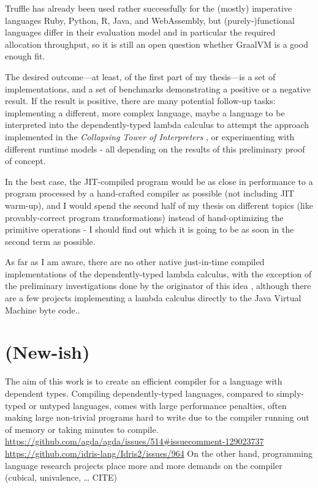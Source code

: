 \documentclass[english,zadani,odsaz]{fitthesis}
\begin{document}
Truffle has already been used rather successfully for the (mostly) imperative
languages Ruby, Python, R, Java, and WebAssembly, but (purely-)functional
languages differ in their evaluation model and in particular the required
allocation throughput, so it is still an open question whether GraalVM is a good
enough fit.

The desired outcome---at least, of the first part of my thesis---is a set of
implementations, and a set of benchmarks demonstrating a positive or a negative
result.  If the result is positive, there are many potential follow-up tasks:
implementing a different, more complex language, maybe a language to be
interpreted into the dependently-typed lambda calculus to attempt the approach
implemented in the \emph{Collapsing Tower of Interpreters} \cite{amin18_collapsing_towers},
or experimenting with different runtime models - all depending on the results of
this preliminary proof of concept.

In the best case, the JIT-compiled program would be as close in performance to a
program processed by a hand-crafted compiler as possible (not including JIT
warm-up), and I would spend the second half of my thesis on different topics
(like provably-correct program transformations) instead of hand-optimizing the
primitive operations - I should find out which it is going to be as soon in the
second term as possible.

As far as I am aware, there are no other native just-in-time compiled
implementations of the dependently-typed lambda calculus, with the exception of
the preliminary investigations done by the originator of this idea
\cite{kmett_2019}, although there are a few projects implementing a lambda
calculus directly to the Java Virtual Machine byte code..

\section{(New-ish)}
\label{sec:org4e351fa}
The aim of this work is to create an efficient compiler for a language with
dependent types. Compiling dependently-typed languages, compared to simply-typed
or untyped languages, comes with large performance penalties, often making large
non-trivial programs hard to write due to the compiler running out of memory or
taking minutes to compile.
\url{https://github.com/agda/agda/issues/514\#issuecomment-129023737}
\url{https://github.com/idris-lang/Idris2/issues/964}
On the other hand, programming language research projects place more and more
demands on the compiler (cubical, univalence, \ldots{} CITE)
\end{document}
